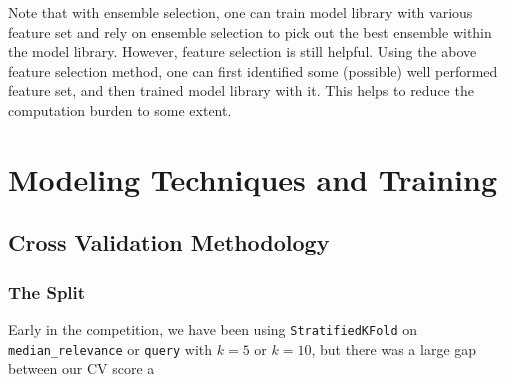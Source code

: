 \documentclass[12pt]{article}
\begin{document}
Note that with ensemble selection, one can train model library with various feature set and rely on ensemble selection to pick out the best ensemble within the model library. However, feature selection is still helpful. Using the above feature selection method, one can first identified some (possible) well performed feature set, and then trained model library with it. This helps to reduce the computation burden to some extent.

\section{Modeling Techniques and Training}
\subsection{Cross Validation Methodology}
\subsubsection{The Split}
Early in the competition, we have been using \texttt{StratifiedKFold} on \texttt{median\_relevance} or \texttt{query} with $k = 5$ or $k = 10$, but there was a large gap between our CV score a
\end{document}
